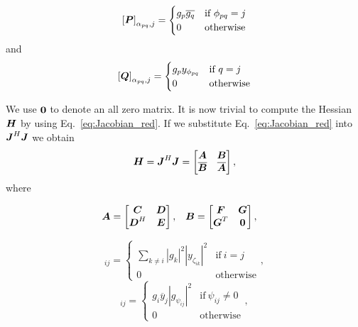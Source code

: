 \documentclass[useAMS,usenatbib]{mn2e}
\newcommand{\bA}{\bmath{A}}
\newcommand{\bB}{\bmath{B}}
\newcommand{\bC}{\bmath{C}}
\newcommand{\bE}{\bmath{E}}
\newcommand{\bF}{\bmath{F}}
\newcommand{\bG}{\bmath{G}}
\newcommand{\bJ}{\bmath{J}}
\newcommand{\bD}{\bmath{D}}
\newcommand{\bH}{\bmath{H}}
\newcommand{\bN}{\bmath{N}}
\newcommand{\bM}{\bmath{M}}
\newcommand{\bP}{\bmath{P}}
\newcommand{\bQ}{\bmath{Q}}
\newcommand{\bzero}{\bmath{0}}
\newcommand{\conj}[1]{\overline{#1}}
\begin{document}
\begin{equation}
\left [ \bP  \right ]_{\alpha_{pq},j} = \begin{cases}
                                         g_p\conj{g_q} & \textrm{if}~\phi_{pq}=j\\
                                         0  & \textrm{otherwise} 
                                        \end{cases}
\end{equation}
and
\begin{equation}
\left [ \bQ  \right ]_{\alpha_{pq},j} = \begin{cases}
                                         g_py_{\phi_{pq}} & \textrm{if}~q=j\\
                                         0  & \textrm{otherwise} 
                                        \end{cases}
\end{equation}

We use $\bzero$ to denote an all zero matrix. It is now trivial to compute the Hessian $\bH$ by using Eq.~\eqref{eq:Jacobian_red}. If we substitute Eq.~\eqref{eq:Jacobian_red} into $\bJ^H\bJ$
we obtain 
\begin{equation}
\label{eq:red_H}
\bH = \bJ^H\bJ = 
\begin{bmatrix}
\bA & \bB\\
\conj{\bB} & \conj{\bA}
\end{bmatrix},
\end{equation}
where

\begin{align}
\bA &= \begin{bmatrix} \bC & \bD\\ \bD^H & \bE \end{bmatrix}, & \bB &= \begin{bmatrix} \bF & \bG\\ \bG^T & \bzero \end{bmatrix},
\end{align}

\begin{equation}
[\bC]_{ij} = 
\begin{cases}
 \sum_{k \neq i} \left | g_k \right |^2 \left | y_{\zeta_{ik}} \right |^2 & \textrm{if} ~ i=j\\
 0 & \textrm{otherwise}
\end{cases},
\end{equation}
\begin{equation}
[\bD]_{ij} = 
\begin{cases}
 g_i \conj{y}_j  \left | g_{\psi_{ij}} \right |^2  & \textrm{if} ~ \psi_{ij}\neq0\\
 0 & \textrm{otherwise}
\end{cases},
\end{equation}
\end{document}
